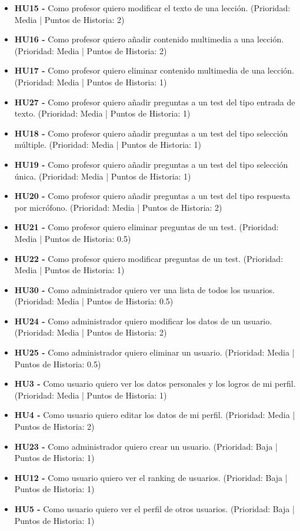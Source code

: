 \begin{itemize}
    \item \textbf{HU15 - } Como profesor quiero modificar el texto de una lección. (Prioridad: Media | Puntos de Historia: 2)
    \item \textbf{HU16 - } Como profesor quiero añadir contenido multimedia a una lección. (Prioridad: Media | Puntos de Historia: 2)
    \item \textbf{HU17 - } Como profesor quiero eliminar contenido multimedia de una lección. (Prioridad: Media | Puntos de Historia: 1)
    \item \textbf{HU27 - } Como profesor quiero añadir preguntas a un test del tipo entrada de texto. (Prioridad: Media | Puntos de Historia: 1)
    \item \textbf{HU18 - } Como profesor quiero añadir preguntas a un test del tipo selección múltiple. (Prioridad: Media | Puntos de Historia: 1)
    \item \textbf{HU19 - } Como profesor quiero añadir preguntas a un test del tipo selección única. (Prioridad: Media | Puntos de Historia: 1)
    \item \textbf{HU20 - } Como profesor quiero añadir preguntas a un test del tipo respuesta por micrófono. (Prioridad: Media | Puntos de Historia: 2)
    \item \textbf{HU21 - } Como profesor quiero eliminar preguntas de un test. (Prioridad: Media | Puntos de Historia: 0.5)
    \item \textbf{HU22 - } Como profesor quiero modificar preguntas de un test. (Prioridad: Media | Puntos de Historia: 1)
    \item \textbf{HU30 - } Como administrador quiero ver una lista de todos los usuarios. (Prioridad: Media | Puntos de Historia: 0.5)
    \item \textbf{HU24 - } Como administrador quiero modificar los datos de un usuario. (Prioridad: Media | Puntos de Historia: 2)
    \item \textbf{HU25 - } Como administrador quiero eliminar un usuario. (Prioridad: Media | Puntos de Historia: 0.5)
    \item \textbf{HU3 - } Como usuario quiero ver los datos personales y los logros de mi perfil. (Prioridad: Media | Puntos de Historia: 1)
    \item \textbf{HU4 - } Como usuario quiero editar los datos de mi perfil. (Prioridad: Media | Puntos de Historia: 2)
    \item \textbf{HU23 - } Como administrador quiero crear un usuario. (Prioridad: Baja | Puntos de Historia: 1)
    \item \textbf{HU12 - } Como usuario quiero ver el ranking de usuarios. (Prioridad: Baja | Puntos de Historia: 1)
    \item \textbf{HU5 - } Como usuario quiero ver el perfil de otros usuarios.  (Prioridad: Baja | Puntos de Historia: 1)

\end{itemize}

